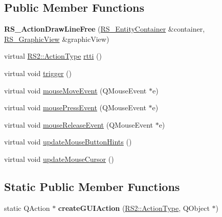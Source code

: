 \subsection*{Public Member Functions}
\begin{DoxyCompactItemize}
\item 
\hypertarget{classRS__ActionDrawLineFree_a66c8ba73cb31830f5789926fe587b2e0}{{\bfseries R\-S\-\_\-\-Action\-Draw\-Line\-Free} (\hyperlink{classRS__EntityContainer}{R\-S\-\_\-\-Entity\-Container} \&container, \hyperlink{classRS__GraphicView}{R\-S\-\_\-\-Graphic\-View} \&graphic\-View)}\label{classRS__ActionDrawLineFree_a66c8ba73cb31830f5789926fe587b2e0}

\item 
virtual \hyperlink{classRS2_afe3523e0bc41fd637b892321cfc4b9d7}{R\-S2\-::\-Action\-Type} \hyperlink{classRS__ActionDrawLineFree_aac7477cf041e1a7fab9724f725eb8dd3}{rtti} ()
\item 
virtual void \hyperlink{classRS__ActionDrawLineFree_abea7d7039bf1eab5f2a20484ccf97976}{trigger} ()
\item 
virtual void \hyperlink{classRS__ActionDrawLineFree_ae17f70a90c25a62a389758f8e05cba35}{mouse\-Move\-Event} (Q\-Mouse\-Event $\ast$e)
\item 
virtual void \hyperlink{classRS__ActionDrawLineFree_af59b58f241f84337cbb0ffdd57c8f415}{mouse\-Press\-Event} (Q\-Mouse\-Event $\ast$e)
\item 
virtual void \hyperlink{classRS__ActionDrawLineFree_a01b6d7993994167c6c75e2903edf9cdd}{mouse\-Release\-Event} (Q\-Mouse\-Event $\ast$e)
\item 
virtual void \hyperlink{classRS__ActionDrawLineFree_a39e995601fcd14e6489945b0f8d711be}{update\-Mouse\-Button\-Hints} ()
\item 
virtual void \hyperlink{classRS__ActionDrawLineFree_a538f486653e300d25dab45646cf2bfba}{update\-Mouse\-Cursor} ()
\end{DoxyCompactItemize}
\subsection*{Static Public Member Functions}
\begin{DoxyCompactItemize}
\item 
\hypertarget{classRS__ActionDrawLineFree_a6143368dd9a0b6637c7aa087be50b263}{static Q\-Action $\ast$ {\bfseries create\-G\-U\-I\-Action} (\hyperlink{classRS2_afe3523e0bc41fd637b892321cfc4b9d7}{R\-S2\-::\-Action\-Type}, Q\-Object $\ast$)}\label{classRS__ActionDrawLineFree_a6143368dd9a0b6637c7aa087be50b263}

\end{DoxyCompactItemize}
